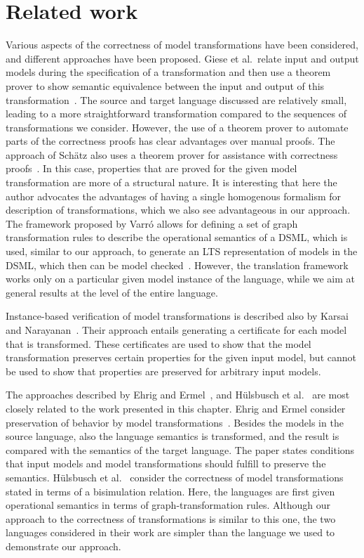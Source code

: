 \section{Related work}
\label{sec:reusable-correct-transformations:related_work}
Various aspects of the correctness of model transformations have been considered, and different approaches have been proposed.
Giese et al.\ relate input and output models during the specification of a transformation and then use a theorem prover to show semantic equivalence between the input and output of this transformation~\cite{Giese06towardsverified}.
The source and target language discussed are relatively small, leading to a more straightforward transformation compared to the sequences of transformations we consider.
However, the use of a theorem prover to automate parts of the correctness proofs has clear advantages over manual proofs.
The approach of Sch{\"a}tz also uses a theorem prover for assistance with correctness proofs~\cite{Schatz10}.
In this case, properties that are proved for the given model transformation are more of a structural nature.
It is interesting that here the author advocates the advantages of having a single homogenous formalism for description of transformations, which we also see advantageous in our approach.
The framework proposed by Varr{\'o} allows for defining a set of graph transformation rules to describe the operational semantics of a DSML, which is used, similar to our approach, to generate an LTS representation of models in the DSML, which then can be model checked~\cite{Varro04}.
However, the translation framework works only on a particular given model instance of the language, while we aim at general results at the level of the entire language.

Instance-based verification of model transformations is described also by Karsai and Narayanan~\cite{Karsai:2006:CMT:1785644.1785646}.
Their approach entails generating a certificate for each model that is transformed.
These certificates are used to show that the model transformation preserves certain properties for the given input model, but cannot be used to show that properties are preserved for arbitrary input models.

The approaches described by Ehrig and Ermel~\cite{EhEr08}, and H{\"u}lsbusch et al.~\cite{Rensink2010} are most closely related to the work presented in this chapter.
Ehrig and Ermel consider preservation of behavior by model transformations~\cite{EhEr08}.
Besides the models in the source language, also the language semantics is transformed, and the result is compared with the semantics of the target language.
The paper states conditions that input models and model transformations should fulfill to preserve the semantics.
H{\"u}lsbusch et al.~\cite{Rensink2010} consider the correctness of model transformations stated in terms of a bisimulation relation.
Here, the languages are first given operational semantics in terms of graph-transformation rules.
Although our approach to the correctness of transformations is similar to this one, the two languages considered in their work are simpler than the language we used to demonstrate our approach.
